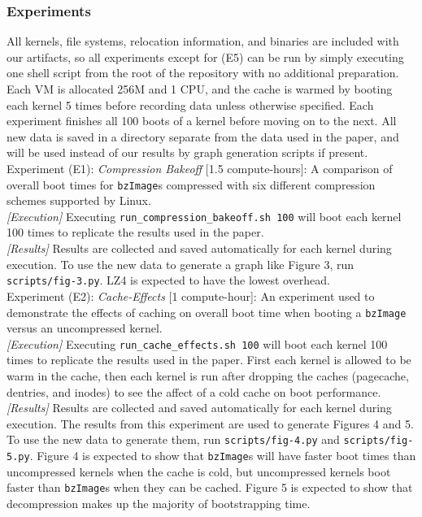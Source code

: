 \documentclass[sigplan,twocolumn]{acmart}
\begin{document}
{\subsubsection{Experiments}
All kernels, file systems, relocation information, and binaries are included
with our artifacts, so all experiments except for (E5) can be run
by simply executing one shell script from the root of the repository with no
additional preparation. Each VM is allocated 256M and 1 CPU, and
the cache is warmed by booting each kernel 5 times before recording data unless otherwise
specified. Each experiment finishes all 100 boots of a kernel before moving on to the next.
All new data is saved in a directory separate
from the data used in the paper, and will be used instead of our results
by graph generation scripts if present.
~\\

Experiment (E1): \textit{Compression Bakeoff} [1.5 compute-hours]: 
A comparison of overall boot times for \texttt{bzImage}s compressed
with six different compression schemes supported by Linux. 
~\\

\textit{[Execution]}
Executing \texttt{run\_compression\_bakeoff.sh 100} will
boot each kernel 100 times to replicate the results used in the paper.
\\

\textit{[Results]}
Results are collected and saved automatically for each kernel during execution. To use the new data to generate 
a graph like Figure 3, run \texttt{scripts/fig-3.py}. LZ4 is expected to
have the lowest overhead. 
~\\

Experiment (E2): \textit{Cache-Effects} [1 compute-hour]: 
An experiment used to demonstrate the effects of caching on overall boot time
when booting a \texttt{bzImage} versus an uncompressed kernel. 
~\\

\textit{[Execution]}
Executing \texttt{run\_cache\_effects.sh 100} will
boot each kernel 100 times to replicate the results used in the paper. First each kernel is allowed to be warm in the cache, then
each kernel is run after dropping the caches (pagecache, dentries, and inodes) to see the affect of a cold cache on boot performance.
\\

\textit{[Results]}
Results are collected and saved automatically for each kernel during execution. The results from
this experiment are used to generate Figures 4 and 5. To use the new data to generate 
them, run \texttt{scripts/fig-4.py} and \texttt{scripts/fig-5.py}. Figure 4 is expected to show that \texttt{bzImage}s will 
have faster boot times than uncompressed kernels when the cache is cold, but uncompressed kernels
boot faster than \texttt{bzImage}s when they can be cached. Figure 5 is expected to show that
decompression makes up the majority of bootstrapping time.
~\\

}
\end{document}
